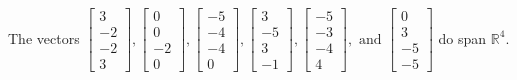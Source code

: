\begin{exercise}
\begin{exerciseStatement}
  \end{exerciseStatement}
  \begin{exerciseAnswer}
   The vectors \(\left[\begin{array}{r}
3 \\
-2 \\
-2 \\
3
\end{array}\right] , \left[\begin{array}{r}
0 \\
0 \\
-2 \\
0
\end{array}\right] , \left[\begin{array}{r}
-5 \\
-4 \\
-4 \\
0
\end{array}\right] , \left[\begin{array}{r}
3 \\
-5 \\
3 \\
-1
\end{array}\right] , \left[\begin{array}{r}
-5 \\
-3 \\
-4 \\
4
\end{array}\right] , \text{ and } \left[\begin{array}{r}
0 \\
3 \\
-5 \\
-5
\end{array}\right]\) 
  	 do  
	span \(\mathbb{R}^4\).
  


  \end{exerciseAnswer}
\end{exercise}